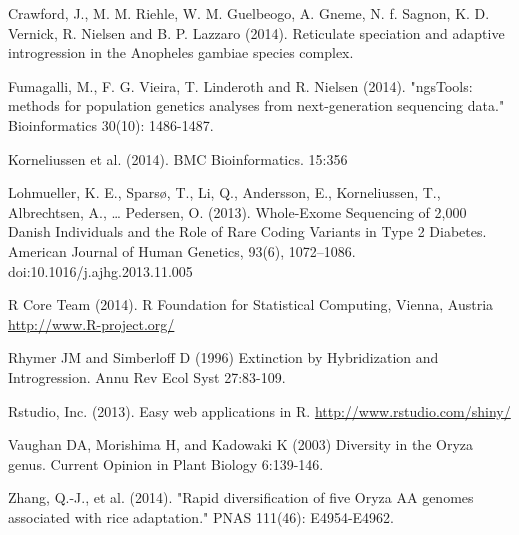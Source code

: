 \documentclass[final]{beamer}
\begin{document}
\begin{frame}[t]
\begin{multicols}{3}
\begin{thebibliography}{99}
 Crawford, J., M. M. Riehle, W. M. Guelbeogo, A. Gneme, N. f. Sagnon, K. D. Vernick, R. Nielsen and B. P. Lazzaro (2014). Reticulate speciation and adaptive introgression in the Anopheles gambiae species complex.

 Fumagalli, M., F. G. Vieira, T. Linderoth and R. Nielsen (2014). "ngsTools: methods for population genetics analyses from next-generation sequencing data." Bioinformatics 30(10): 1486-1487.

 Korneliussen et al. (2014). BMC Bioinformatics. 15:356

 Lohmueller, K. E., Sparsø, T., Li, Q., Andersson, E., Korneliussen, T., Albrechtsen, A., … Pedersen, O. (2013). Whole-Exome Sequencing of 2,000 Danish Individuals and the Role of Rare Coding Variants in Type 2 Diabetes. American Journal of Human Genetics, 93(6), 1072–1086. doi:10.1016/j.ajhg.2013.11.005

 R Core Team (2014). R Foundation for Statistical Computing, Vienna, Austria \url{http://www.R-project.org/}

 Rhymer JM and Simberloff D (1996) Extinction by Hybridization and Introgression. Annu Rev Ecol Syst 27:83-109.

 Rstudio, Inc. (2013). Easy web applications in R. \url{http://www.rstudio.com/shiny/}

 Vaughan DA, Morishima H, and Kadowaki K (2003) Diversity in the Oryza genus. Current Opinion in Plant Biology 6:139-146.

 Zhang, Q.-J., et al. (2014). "Rapid diversification of five Oryza AA genomes associated with rice adaptation." PNAS 111(46): E4954-E4962.



\end{thebibliography}

\end{multicols}

\end{frame}
\end{document}
